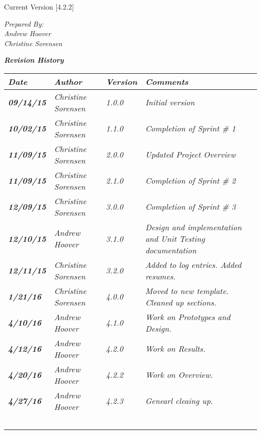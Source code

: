 


Current Version [4.2.2]
\vspace*{5mm}

{\color{SDColor5}
\noindent
\textit{Prepared By:}\\
\textit{Andrew Hoover}\\
\textit{Christine Sorensen}
}

\vfill
\noindent
{\color{SDColor3} \textit{\textbf{Revision History}}}\\
\begin{tabular}{|>{\raggedright}p{1.5cm}|>{\raggedright}p{3cm}|>{\raggedright}p{1.5cm}|>{\raggedright}p{9cm}|}
\hline
\textit{\textbf{Date}} &  \textit{\textbf{Author}} & \textit{\textbf{Version}} & \textit{\textbf{Comments}}\tabularnewline
\hline

\textit{\textbf{09/14/15}} & \textit{Christine Sorensen} & \textit{1.0.0} & \textit{Initial version}\tabularnewline
\hline
\textit{\textbf{10/02/15}} & \textit{Christine Sorensen} & \textit{1.1.0} & \textit{Completion of Sprint \# 1}\tabularnewline
\hline
\textit{\textbf{11/09/15}} & \textit{Christine Sorensen} & \textit{2.0.0} & \textit{Updated Project Overview}\tabularnewline
\hline
\textit{\textbf{11/09/15}} & \textit{Christine Sorensen} & \textit{2.1.0} & \textit{Completion of Sprint \# 2}\tabularnewline
\hline
\textit{\textbf{12/09/15}} & \textit{Christine Sorensen} & \textit{3.0.0} & \textit{Completion of Sprint \# 3}\tabularnewline
\hline
\textit{\textbf{12/10/15}} & \textit{Andrew Hoover} & \textit{3.1.0} & \textit{Design and implementation and Unit Testing documentation}\tabularnewline
\hline
\textit{\textbf{12/11/15}} & \textit{Christine Sorensen} & \textit{3.2.0} & \textit{Added to log entries. Added resumes.}\tabularnewline
\hline
\textit{\textbf{1/21/16}} & \textit{Christine Sorensen} & \textit{4.0.0} & \textit{Moved to new template. Cleaned up sections.}\tabularnewline
\hline
\textit{\textbf{4/10/16}} & \textit{Andrew Hoover} & \textit{4.1.0} & \textit{Work on Prototypes and Design.}\tabularnewline
\hline
\textit{\textbf{4/12/16}} & \textit{Andrew Hoover} & \textit{4.2.0} & \textit{Work on Results.}\tabularnewline
\hline
\textit{\textbf{4/20/16}} & \textit{Andrew Hoover} & \textit{4.2.2} & \textit{Work on Overview.}\tabularnewline
\hline
\textit{\textbf{4/27/16}} & \textit{Andrew Hoover} & \textit{4.2.3} & \textit{Genearl cleaing up.}\tabularnewline



\hline
 &  &  & \tabularnewline
 \hline
 &  &  & \tabularnewline
\hline
 &  &  & \tabularnewline
\hline
 &  &  & \tabularnewline
\hline
 &  &  & \tabularnewline
\hline
\end{tabular}
\vfill

